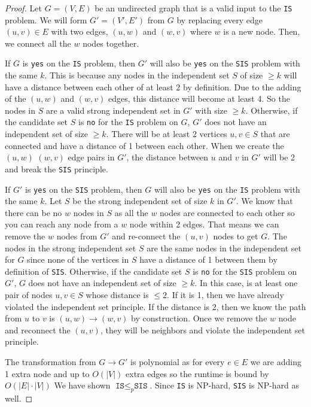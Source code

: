 \documentclass{article}
\begin{document}
\begin{proof}
    Let $G = (V, E)$ be an undirected graph that is a valid input to the \texttt{IS} problem.
    We will form $G' = (V', E')$ from $G$ by replacing every edge $(u, v) \in E$ with two edges, $(u, w)$ and $(w, v)$ where $w$ is a new node.
    Then, we connect all the $w$ nodes together.

    If $G$ is \texttt{yes} on the \texttt{IS} problem, then $G'$ will also be \texttt{yes} on the \texttt{SIS} problem with the same $k$.
    This is because any nodes in the independent set $S$ of size $\geq k$ will have a distance between each other of at least 2 by definition. 
    Due to the adding of the $(u, w)$ and $(w, v)$ edges, this distance will become at least 4. So the nodes in $S$ are a valid strong independent set in $G'$ with size $\geq k$.
    Otherwise, if the candidate set $S$ is \texttt{no} for the \texttt{IS} problem on $G$, $G'$ does not have an independent set of size $\geq k$.
    There will be at least 2 vertices $u,v \in S$ that are connected and have a distance of 1 between each other. When we create the $(u, w)$ $(w, v)$ edge pairs in $G'$, the distance between $u$ and $v$ in $G'$ will be 2 and break the \texttt{SIS} principle.

    If $G'$ is \texttt{yes} on the \texttt{SIS} problem, then $G$ will also be \texttt{yes} on the \texttt{IS} problem with the same $k$.
    Let $S$ be the strong independent set of size $k$ in $G'$. 
    We know that there can be no $w$ nodes in $S$ as all the $w$ nodes are connected to each other so you can reach any node from a $w$ node within 2 edges.
    That means we can remove the $w$ nodes from $G'$ and re-connect the $(u, v)$ nodes to get $G$. The nodes in the strong independent set $S$ are the same nodes in the independent set for $G$ since none of the vertices in $S$ have a distance of 1 between them by definition of \texttt{SIS}.
    Otherwise, if the candidate set $S$ is \texttt{no} for the \texttt{SIS} problem on $G'$, $G$ does not have an independent set of size $\geq k$. 
    In this case, is at least one pair of nodes $u, v \in S$ whose distance is $\leq 2$. If it is 1, then we have already violated the independent set principle.
    If the distance is 2, then we know the path from $u$ to $v$ is $(u, w) \rightarrow (w, v)$ by construction. Once we remove the $w$ node and reconnect the $(u, v)$, they will be neighbors and violate the independent set principle.

    The transformation from $G \rightarrow G'$ is polynomial as for every $e \in E$ we are adding 1 extra node and up to $O(|V|)$ extra edges so the runtime is bound by $O(|E| \cdot |V|)$
    We have shown $\texttt{IS} \leq_p \texttt{SIS}$. Since \texttt{IS} is NP-hard, \texttt{SIS} is NP-hard as well.
\end{proof}
\end{document}
